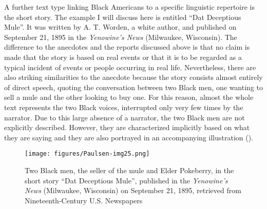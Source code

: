 A further text type linking Black Americans to a specific linguistic repertoire is the short story. The example I will discuss here is entitled “Dat Deceptious Mule”. It was written by A. T. Worden, a white author, and published on September 21, 1895 in the \emph{Yenowine’s News} (Milwaukee, Wisconsin). The difference to the anecdotes and the reports discussed above is that no claim is made that the story is based on real events or that it is to be regarded as a typical incident of events or people occurring in real life. Nevertheless, there are also striking similarities to the anecdote because the story consists almost entirely of direct speech, quoting the conversation between two Black men, one wanting to sell a mule and the other looking to buy one. For this reason, almost the whole text represents the two Black voices, interrupted only very few times by the narrator. Due to this large absence of a narrator, the two Black men are not explicitly described. However, they are characterized implicitly based on what they are saying and they are also portrayed in an accompanying illustration ().
\begin{figure}
\texttt{[image: figures/Paulsen-img25.png]}
\caption{
Two Black men, the seller of the mule and Elder Pokeberry, in the short story “Dat Deceptious Mule”, published in the \emph{Yenowine’s News} (Milwaukee, Wisconsin) on September 21, 1895, retrieved from Nineteenth-Century U.S. Newspapers
}
\label{fig:key:25}
\end{figure}
